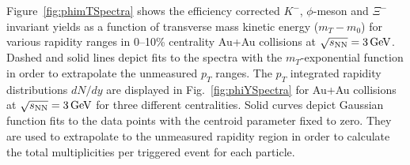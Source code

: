 \documentclass[%
 reprint,	
showpacs,
 amsmath,amssymb,
 aps,
 prc,
]{revtex4-1}
\begin{document}
Figure~\ref{fig:phimTSpectra} shows the efficiency corrected $K^-$, $\phi$-meson and $\Xi^-$ invariant yields as a function of transverse mass kinetic energy ($m_T-m_0$) for various rapidity ranges in 0--10\% centrality Au+Au collisions at ${\sqrt{s_{\rm NN}} = \rm{3\,GeV}}$. %
Dashed and solid lines depict fits to the spectra with the $m_T$-exponential function in order to extrapolate the unmeasured $p_T$ ranges. 
The $p_T$ integrated rapidity distributions $dN/dy$ are displayed in Fig.~\ref{fig:phiYSpectra} for Au+Au collisions at ${\sqrt{s_{\rm NN}} = \rm{3\,GeV}}$ for three different centralities. %
Solid curves depict Gaussian function fits to the data points with the centroid parameter fixed to zero. They are used to extrapolate to the unmeasured rapidity region in order to calculate the total multiplicities per triggered event for each particle.
\end{document}
